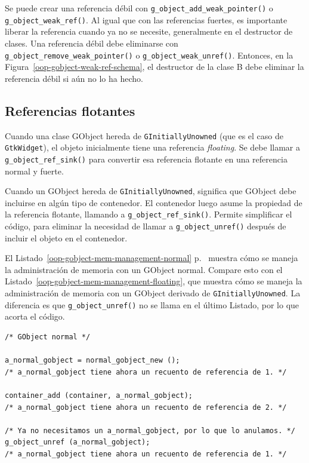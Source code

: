 Se puede crear una referencia débil con \lstinline{g_object_add_weak_pointer()} o \lstinline{g_object_weak_ref()}. Al igual que con las referencias fuertes, es importante liberar la referencia cuando ya no se necesite, generalmente en el destructor de clases. Una referencia débil debe eliminarse con \lstinline{g_object_remove_weak_pointer()} o \lstinline{g_object_weak_unref()}. Entonces, en la Figura~\ref{oop-gobject-weak-ref-schema}, el destructor de la clase B debe eliminar la referencia débil si aún no lo ha hecho.

\subsection{Referencias flotantes}

Cuando una clase GObject hereda de \lstinline{GInitiallyUnowned} (que es el caso de \lstinline{GtkWidget}), el objeto inicialmente tiene una referencia \emph{floating}. Se debe llamar a \lstinline{g_object_ref_sink()} para convertir esa referencia flotante en una referencia normal y fuerte.

Cuando un GObject hereda de \lstinline{GInitiallyUnowned}, significa que GObject debe incluirse en algún tipo de contenedor. El contenedor luego asume la propiedad de la referencia flotante, llamando a \lstinline{g_object_ref_sink()}. Permite simplificar el código, para eliminar la necesidad de llamar a \lstinline{g_object_unref()} después de incluir el objeto en el contenedor.

El Listado~\ref{oop-gobject-mem-management-normal} p.~\pageref{oop-gobject-mem-management-normal} muestra cómo se maneja la administración de memoria con un GObject normal. Compare esto con el Listado~\ref{oop-gobject-mem-management-floating}, que muestra cómo se maneja la administración de memoria con un GObject derivado de \lstinline{GInitiallyUnowned}. La diferencia es que \lstinline{g_object_unref()} no se llama en el último Listado, por lo que acorta el código.

\begin{lstlisting}[style=GLib/GTK, caption={Gestión de la memoria de GObjects normales.}, label=oop-gobject-mem-management-normal]
/* GObject normal */

a_normal_gobject = normal_gobject_new ();
/* a_normal_gobject tiene ahora un recuento de referencia de 1. */

container_add (container, a_normal_gobject);
/* a_normal_gobject tiene ahora un recuento de referencia de 2. */

/* Ya no necesitamos un a_normal_gobject, por lo que lo anulamos. */
g_object_unref (a_normal_gobject);
/* a_normal_gobject tiene ahora un recuento de referencia de 1. */
\end{lstlisting}

